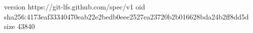 version https://git-lfs.github.com/spec/v1
oid sha256:4173eaf33340470eab22e2bedb0eee2527ea23720b2b016628bda24b2ff8dd5d
size 43840
